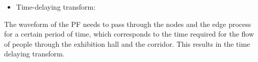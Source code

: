 \begin{itemize}
    \item Time-delaying transform:
\end{itemize}
    The waveform of the PF needs to pass through the nodes and the edge process for a certain period of time, which corresponds to the time required for the flow of people through the exhibition hall and the corridor. This results in the time delaying transform.
    
    
    \begin{figure}[htbp]
    \centering
    \centering
    \centering
    \end{figure}


